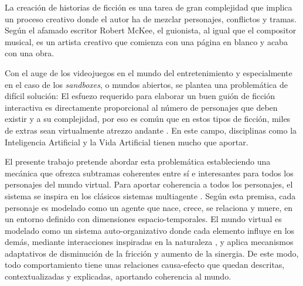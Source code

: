 




\begin{resumen}        %



La creación de historias de ficción es una tarea de gran complejidad que implica un proceso creativo donde el autor ha de mezclar personajes, conflictos y tramas. Según el afamado escritor Robert McKee,
el guionista, al igual que el compositor musical, es un artista creativo que comienza con una página en blanco y acaba con una obra.



Con el auge de los videojuegos en el mundo del entretenimiento
y especialmente en el caso de los \textit{sandboxes}, o mundos abiertos, se plantea una problemática de difícil solución: El esfuezo requerido para elaborar un buen guión de ficción interactiva es directamente proporcional al número de personajes que deben existir y a su complejidad, por eso es común que en estos tipos de ficción, miles de extras sean virtualmente atrezzo andante
. En este campo, disciplinas como la Inteligencia Artificial y la Vida Artificial tienen mucho que aportar.


El presente trabajo pretende abordar esta problemática estableciendo una mecánica que ofrezca subtramas coherentes entre sí e interesantes para todos los personajes del mundo virtual.
Para aportar coherencia a todos los personajes, el sistema se inspira en los clásicos sistemas multiagente
. Según esta premisa, cada personaje es modelado como un agente que nace, crece, se relaciona y muere, en un entorno definido con dimensiones espacio-temporales. El mundo virtual es modelado como un sistema auto-organizativo donde cada elemento influye en los demás, mediante interacciones inspiradas en la naturaleza
, y aplica mecanismos adaptativos de disminución de la fricción y aumento de la sinergia. De este modo, todo comportamiento tiene unas relaciones causa-efecto que quedan descritas, contextualizadas y explicadas, aportando coherencia al mundo.


\end{resumen}
